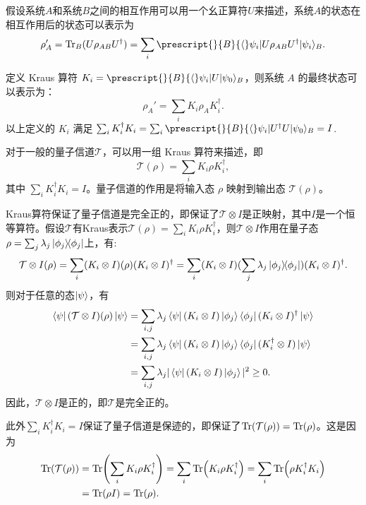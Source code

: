 假设系统$A$和系统$B$之间的相互作用可以用一个幺正算符$U$来描述，系统$A$的状态在相互作用后的状态可以表示为
\begin{equation}
    \rho_A' = \Tr_B(U\rho_{AB}U^\dagger) = \sum_i \prescript{}{B}{\langle} \psi_i|U\rho_{AB}U^\dagger|\psi_i\rangle_B.
\end{equation}

定义 Kraus 算符 $K_i = \prescript{}{B}{\langle} \psi_i|U|\psi_0\rangle_B$，则系统 $A$ 的最终状态可以表示为：
\begin{equation}
    \rho_A' = \sum_i K_i \rho_A K_i^\dagger.
\end{equation}
以上定义的 $K_i$ 满足 $\sum_i K_i^\dagger K_i = \sum_i \prescript{}{B}{\langle} \psi_i|U^\dagger U|\psi_0\rangle_B = I$.

对于一般的量子信道$\mathcal{T}$，可以用一组 Kraus 算符来描述，即
\begin{equation}
    \mathcal{T}(\rho) = \sum_i K_i \rho K_i^\dagger,
\end{equation}
其中 $\sum_i K_i^\dagger K_i = I$。量子信道的作用是将输入态 $\rho$ 映射到输出态 $\mathcal{T}(\rho)$。

Kraus算符保证了量子信道是完全正的，即保证了$\mathcal{T}\otimes I$是正映射，其中$I$是一个恒等算符。假设$\mathcal{T}$有Kraus表示$\mathcal{T}(\rho) = \sum_i K_i \rho K_i^\dagger$，则$\mathcal{T}\otimes I$作用在量子态$\rho=\sum_j \lambda_j \ketbra{\phi_j}$上，有:
\begin{equation}
        \mathcal{T}\otimes I(\rho) = \sum_i (K_i \otimes I)(\rho)(K_i \otimes I)^\dagger = \sum_i (K_i \otimes I)(\sum_j \lambda_j \ketbra{\phi_j})(K_i \otimes I)^\dagger.
\end{equation}
则对于任意的态$\ket{\psi}$，有
\begin{equation}
    \begin{aligned}
        \bra{\psi}(\mathcal{T}\otimes I)(\rho)\ket{\psi} &= \sum_{i,j} \lambda_j \bra{\psi}(K_i \otimes I)\ket{\phi_j}\bra{\phi_j}(K_i \otimes I)^\dagger\ket{\psi} \\
        &= \sum_{i,j} \lambda_j \bra{\psi}(K_i \otimes I)\ket{\phi_j}\bra{\phi_j}(K_i^\dagger \otimes I)\ket{\psi} \\
        &= \sum_{i,j} \lambda_j |\bra{\psi}(K_i \otimes I)\ket{\phi_j}|^2 \geq 0.
    \end{aligned}
\end{equation}
因此，$\mathcal{T}\otimes I$是正的，即$\mathcal{T}$是完全正的。

此外$\sum_i K_i^\dagger K_i = I$保证了量子信道是保迹的，即保证了$\Tr(\mathcal{T}(\rho)) = \Tr(\rho)$。这是因为
\begin{equation}
    \begin{aligned}
        \Tr(\mathcal{T}(\rho)) &= \Tr(\sum_i K_i \rho K_i^\dagger) = \sum_i \Tr(K_i \rho K_i^\dagger) = \sum_i \Tr(\rho K_i^\dagger K_i) \\
        &= \Tr(\rho I) = \Tr(\rho).
    \end{aligned}
\end{equation}


